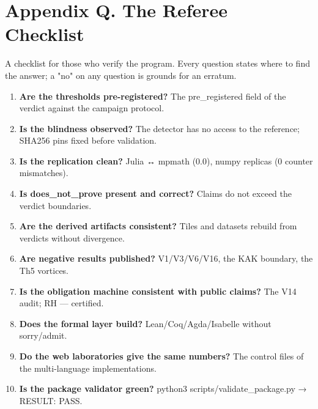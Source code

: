 \documentclass[11pt,a4paper]{article}
\begin{document}
\section{Appendix Q. The Referee Checklist}

A checklist for those who verify the program. Every question states where to find the answer; a "no" on any question is grounds for an erratum.

\begin{enumerate}
  \item \textbf{Are the thresholds pre-registered?} The pre\_registered field of the verdict against the campaign protocol.
  \item \textbf{Is the blindness observed?} The detector has no access to the reference; SHA256 pins fixed before validation.
  \item \textbf{Is the replication clean?} Julia ↔ mpmath (0.0), numpy replicas (0 counter mismatches).
  \item \textbf{Is does\_not\_prove present and correct?} Claims do not exceed the verdict boundaries.
  \item \textbf{Are the derived artifacts consistent?} Tiles and datasets rebuild from verdicts without divergence.
  \item \textbf{Are negative results published?} V1/V3/V6/V16, the KAK boundary, the Th5 vortices.
  \item \textbf{Is the obligation machine consistent with public claims?} The V14 audit; RH — certified.
  \item \textbf{Does the formal layer build?} Lean/Coq/Agda/Isabelle without sorry/admit.
  \item \textbf{Do the web laboratories give the same numbers?} The control files of the multi-language implementations.
  \item \textbf{Is the package validator green?} python3 scripts/validate\_package.py → RESULT: PASS.
\end{enumerate}
\end{document}
